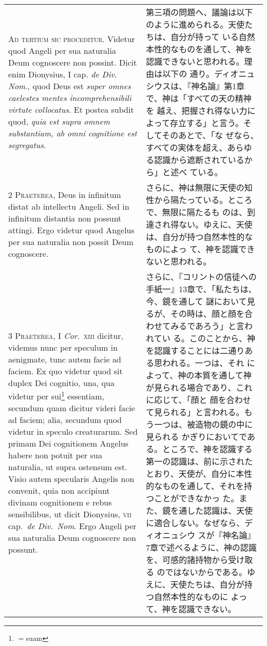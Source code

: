 \documentclass[10pt]{jsarticle} %
\begin{document}
\begin{longtable}{p{21em}p{21em}}

{\huge A}{\scshape d tertium sic proceditur}. Videtur quod Angeli per
sua naturalia Deum cognoscere non possint. Dicit enim Dionysius, I
cap. {\itshape de Div. Nom}., quod Deus est {\itshape super omnes
caelestes mentes incomprehensibili virtute collocatus}. Et postea
subdit quod, {\itshape quia est supra omnem substantiam, ab omni
cognitione est segregatus}.


&


第三項の問題へ、議論は以下のように進められる。天使たちは、自分が持って
いる自然本性的なものを通して、神を認識できないと思われる。理由は以下の
通り。ディオニュシウスは、『神名論』第1章で、神は「すべての天の精神を
越え、把握され得ない力によって存立する」と言う。そしてそのあとで、「な
ぜなら、すべての実体を超え、あらゆる認識から遮断されているから」と述べ
ている。

\\



{\scshape 2 Praeterea}, Deus in infinitum distat ab intellectu
Angeli. Sed in infinitum distantia non possunt attingi. Ergo videtur
quod Angelus per sua naturalia non possit Deum cognoscere.


&

さらに、神は無限に天使の知性から隔たっている。ところで、無限に隔たるも
のは、到達され得ない。ゆえに、天使は、自分が持つ自然本性的なものによっ
て、神を認識できないと思われる。

\\


{\scshape 3 Praeterea}, I {\itshape Cor}.~{\scshape xiii} dicitur,
videmus nunc per speculum in aenigmate, tunc autem facie ad faciem. Ex
quo videtur quod sit duplex Dei cognitio, una, qua videtur per
sui\footnote{$=$suam} essentiam, secundum quam dicitur videri facie ad
faciem; alia, secundum quod videtur in speculo creaturarum. Sed primam
Dei cognitionem Angelus habere non potuit per sua naturalia, ut supra
ostensum est. Visio autem specularis Angelis non convenit, quia non
accipiunt divinam cognitionem e rebus sensibilibus, ut dicit
Dionysius, {\scshape vii} cap.~{\itshape de Div.~Nom}. Ergo Angeli per
sua naturalia Deum cognoscere non possunt.


&

さらに、『コリントの信徒への手紙一』13章で、「私たちは、今、鏡を通して
謎において見るが、その時は、顔と顔を合わせてみるであろう」と言われてい
る。このことから、神を認識することには二通りある思われる。一つは、それ
によって、神の本質を通して神が見られる場合であり、これに応じて、「顔と
顔を合わせて見られる」と言われる。もう一つは、被造物の鏡の中に見られる
かぎりにおいてである。ところで、神を認識する第一の認識は、前に示された
とおり、天使が、自分に本性的なものを通して、それを持つことができなかっ
た。また、鏡を通した認識は、天使に適合しない。なぜなら、ディオニュシウ
スが『神名論』7章で述べるように、神の認識を、可感的諸持物から受け取る
のではないからである。ゆえに、天使たちは、自分が持つ自然本性的なものに
よって、神を認識できない。



\end{longtable}
\end{document}

